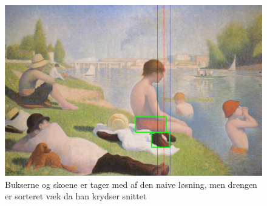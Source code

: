 \begin{figure}[h!!]
	\begin{center}
		\includegraphics[scale=0.3,angle=0]{afsnit/afprovning/billeder/naive_losning/naiv_mfarver_mdetaljer.png}
	\end{center}
	\caption[]{Bukserne og skoene er tager med af den naive løsning, men
	drengen er sorteret væk da han krydser snittet}
	\label{naiv_mfarver_mdetaljer}
\end{figure}

